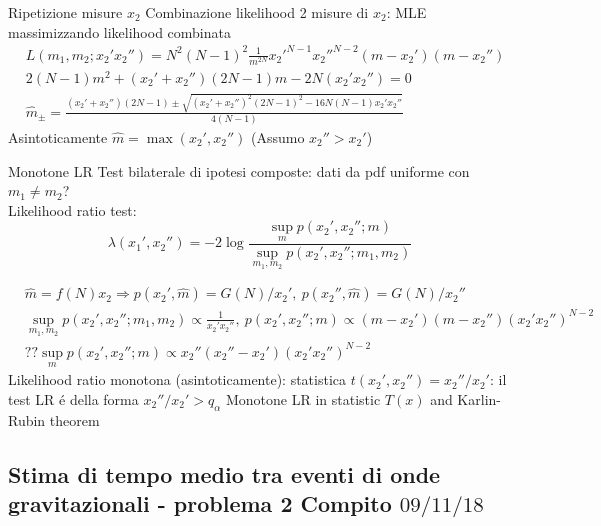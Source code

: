 \begin{frame}{Ripetizione misure $x_2$}
Combinazione likelihood 2 misure di $x_2$: MLE massimizzando likelihood combinata
\begin{align*}
&L(m_1,m_2;x_2'x_2'')=N^2(N-1)^2\frac{1}{m^{2N}}{x_2'}^{N-1}{x_2''}^{N-2}(m-x_2')(m-x_2'')\\
&2(N-1)m^2+(x_2'+x_2'')(2N-1)m-2N(x_2'x_2'')=0\\
&\hat{m}_{\pm}=\frac{(x_2'+x_2'')(2N-1)\pm\sqrt{(x_2'+x_2'')^2(2N-1)^2-16N(N-1)x_2'x_2''}}{4(N-1)}
\end{align*}
Asintoticamente $\hat{m}=\max{(x_2',x_2'')}$ (Assumo $x_2''>x_2'$)
\end{frame}

\begin{frame}{Monotone LR}
Test bilaterale di ipotesi composte: dati da pdf uniforme con $m_1\neq m_2$? \\
Likelihood ratio test:
\begin{equation*}
\lambda(x_1',x_2'')=-2\log{\frac{\sup_m{p(x_2',x_2'';m)}}{\sup_{m_1,m_2}{p(x_2',x_2'';m_1,m_2)}}}
\end{equation*}

\begin{align*}
&\hat{m}=f(N)x_2\Rightarrow p(x_2',\hat{m})=G(N)/x_2',\ p(x_2'',\hat{m})=G(N)/x_2''\\
&\sup_{m_1,m_2}{p(x_2',x_2'';m_1,m_2)}\propto\frac{1}{x_2'x_2''},\ p(x_2',x_2'';m)\propto(m-x_2')(m-x_2'')(x_2'x_2'')^{N-2}\\
&??\sup_{m}p(x_2',x_2'';m)\propto x_2''(x_2''-x_2')(x_2'x_2'')^{N-2}
\end{align*}
Likelihood ratio monotona (asintoticamente): statistica $t(x_2',x_2'')=x_2''/x_2'$: il test LR \'e della forma $x_2''/x_2'>q_{\alpha}$
Monotone LR in statistic $T(x)$ and Karlin-Rubin theorem
\end{frame}

\subsection{Stima di tempo medio tra eventi di onde gravitazionali - problema 2 Compito $09/11/18$}

